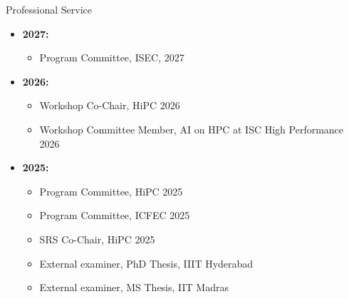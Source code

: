 \documentclass{resume} %
\begin{document}
 
\begin{rSection}{Professional Service}
\begin{itemize}	
	\item \textbf{2027:}
	\begin{itemize}	
		\item Program Committee, ISEC, 2027
	\end{itemize}
	\item \textbf{2026:}
	\begin{itemize}	
		\item Workshop Co-Chair, HiPC 2026
		\item Workshop Committee Member, AI on HPC at ISC High Performance 2026
	\end{itemize}
	\item \textbf{2025:}
	\begin{itemize}	
		\item Program Committee, HiPC 2025
		\item Program Committee, ICFEC 2025
		\item SRS Co-Chair, HiPC 2025
		\item External examiner, PhD Thesis, IIIT Hyderabad
		\item External examiner, MS Thesis, IIT Madras
	\end{itemize}
	

\end{itemize}
\end{rSection}
\end{document}
